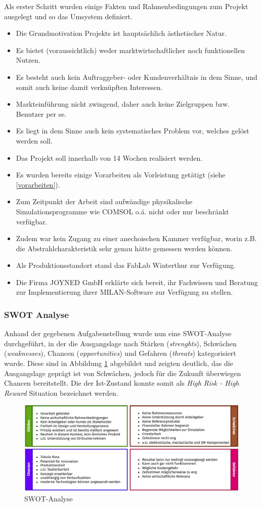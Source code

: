 Als erster Schritt wurden einige Fakten und Rahmenbedingungen zum Projekt ausgelegt und so das Umsystem definiert.
\begin{itemize}
	\item Die Grundmotivation Projekts ist hauptsächlich ästhetischer Natur.
	\item Es bietet (voraussichtlich) weder marktwirtschaftlicher noch funktionellen Nutzen.
	\item Es besteht auch kein Auftraggeber- oder Kundenverhältnis in dem Sinne, und somit auch keine damit verknüpften Interessen.
	\item Markteinführung nicht zwingend, daher auch keine Zielgruppen bzw. Benutzer per se.
	\item Es liegt in dem Sinne auch kein systematisches Problem vor, welches gelöst werden soll.
	\item Das Projekt soll innerhalb von 14 Wochen realisiert werden.
	\item Es wurden bereits einige Vorarbeiten als Vorleistung getätigt (siehe \ref{vorarbeiten}).
	\item Zum Zeitpunkt der Arbeit sind aufwändige physikalische Simulationsprogramme wie COMSOL o.ä. nicht oder nur beschränkt verfügbar.
	\item Zudem war kein Zugang zu einer anechoischen Kammer verfügbar, worin z.B. die Abstrahlcharakteristik sehr genau hätte gemessen werden können.
	\item Als Produktionsstandort stand das FabLab Winterthur zur Verfügung.
	\item Die Firma JOYNED GmbH erklärte sich bereit, ihr Fachwissen und Beratung zur Implementierung ihrer MILAN-Software zur Verfügung zu stellen.
\end{itemize}
\subsubsection{SWOT Analyse}
Anhand der gegebenen Aufgabenstellung wurde nun eine SWOT-Analyse durchgeführt, in der die Ausgangslage nach Stärken (\textit{strenghts}), Schwächen (\textit{weaknesses}), Chancen (\textit{opportunities}) und Gefahren (\textit{threats}) kategorisiert wurde. Diese sind in Abbildung \ref{pics:swot}  abgebildet und zeigten deutlich, das die Ausgangslage geprägt ist von Schwächen, jedoch für die Zukunft überwiegen Chancen bereitstellt. Die der Ist-Zustand konnte somit als \textit{High Risk - High Reward} Situation bezeichnet werden.
\begin{figure}[H]
	\centering
	\includegraphics[width=\textwidth]{pictures/SWOT.pdf}
	\caption{SWOT-Analyse}
	\label{pics:swot}
\end{figure}
